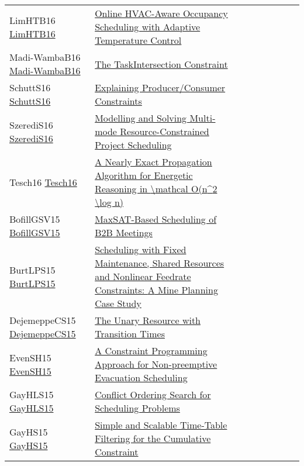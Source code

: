 {\begin{longtable}{p{3cm}p{7cm}lllllll}
LimHTB16 \href{https://doi.org/10.1007/978-3-319-44953-1\_43}{LimHTB16} &  \href{papers/LimHTB16.pdf}{Online HVAC-Aware Occupancy Scheduling with Adaptive Temperature Control} &  &  &  &  &  &  & \\
Madi-WambaB16 \href{https://doi.org/10.1007/978-3-319-33954-2\_18}{Madi-WambaB16} &  \href{papers/Madi-WambaB16.pdf}{The TaskIntersection Constraint} &  &  &  &  &  &  & \\
SchuttS16 \href{https://doi.org/10.1007/978-3-319-44953-1\_28}{SchuttS16} &  \href{papers/SchuttS16.pdf}{Explaining Producer/Consumer Constraints} &  &  &  &  &  &  & \\
SzerediS16 \href{https://doi.org/10.1007/978-3-319-44953-1\_31}{SzerediS16} &  \href{papers/SzerediS16.pdf}{Modelling and Solving Multi-mode Resource-Constrained Project Scheduling} &  &  &  &  &  &  & \\
Tesch16 \href{https://doi.org/10.1007/978-3-319-44953-1\_32}{Tesch16} &  \href{papers/Tesch16.pdf}{A Nearly Exact Propagation Algorithm for Energetic Reasoning in {\textbackslash}mathcal O(n{\^{}}2 {\textbackslash}log n)} &  &  &  &  &  &  & \\
BofillGSV15 \href{https://doi.org/10.1007/978-3-319-18008-3\_5}{BofillGSV15} &  \href{papers/BofillGSV15.pdf}{MaxSAT-Based Scheduling of {B2B} Meetings} &  &  &  &  &  &  & \\
BurtLPS15 \href{https://doi.org/10.1007/978-3-319-18008-3\_7}{BurtLPS15} &  \href{papers/BurtLPS15.pdf}{Scheduling with Fixed Maintenance, Shared Resources and Nonlinear Feedrate Constraints: {A} Mine Planning Case Study} &  &  &  &  &  &  & \\
DejemeppeCS15 \href{https://doi.org/10.1007/978-3-319-23219-5\_7}{DejemeppeCS15} &  \href{papers/DejemeppeCS15.pdf}{The Unary Resource with Transition Times} &  &  &  &  &  &  & \\
EvenSH15 \href{https://doi.org/10.1007/978-3-319-23219-5\_40}{EvenSH15} &  \href{papers/EvenSH15.pdf}{A Constraint Programming Approach for Non-preemptive Evacuation Scheduling} &  &  &  &  &  &  & \\
GayHLS15 \href{https://doi.org/10.1007/978-3-319-23219-5\_10}{GayHLS15} &  \href{papers/GayHLS15.pdf}{Conflict Ordering Search for Scheduling Problems} &  &  &  &  &  &  & \\
GayHS15 \href{https://doi.org/10.1007/978-3-319-23219-5\_11}{GayHS15} &  \href{papers/GayHS15.pdf}{Simple and Scalable Time-Table Filtering for the Cumulative Constraint} &  &  &  &  &  &  & \\

\end{longtable}}
